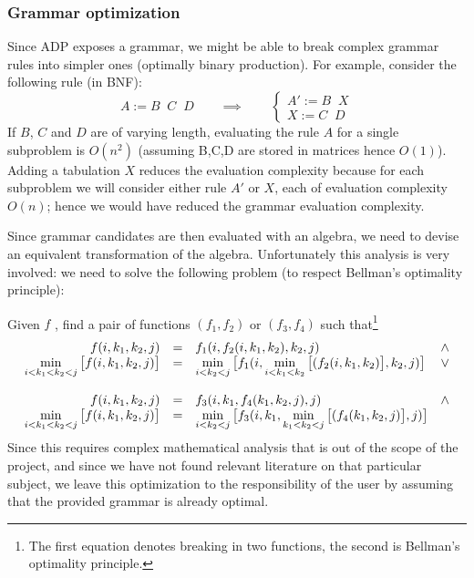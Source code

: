 \subsubsection{Grammar optimization} \label{grammar_opt}
Since ADP exposes a grammar, we might be able to break complex grammar rules into simpler ones (optimally binary production). For example, consider the following rule (in BNF):
\[A := B\;\;C\;\;D \qquad \implies \qquad \left\{\begin{array}{l} A' := B\;\;X \\ X := C\;\;D \end{array} \right. \]
If $B$, $C$ and $D$ are of varying length, evaluating the rule $A$ for a single subproblem is $O(n^2)$ (assuming B,C,D are stored in matrices hence $O(1)$). Adding a tabulation $X$ reduces the evaluation complexity because for each subproblem we will consider either rule $A'$ or $X$, each of evaluation complexity $O(n)$; hence we would have reduced the grammar evaluation complexity.

Since grammar candidates are then evaluated with an algebra, we need to devise an equivalent transformation of the algebra. Unfortunately this analysis is very involved: we need to solve the following problem (to respect Bellman's optimality principle\cite{bellman_principle}):

Given $f$ , find a pair of functions $(f_1,f_2)$ or $(f_3,f_4)$ such that\footnote{The first equation denotes breaking in two functions, the second is Bellman's optimality principle.}
\[\begin{array}{rcll}
f(i,k_1,k_2,j) &=& f_1(i,f_2(i,k_1,k_2),k_2,j) & \land \\
	\min\limits_{i<k_1<k_2<j}\big[ f(i,k_1,k_2,j) \big] &=& \min\limits_{i<k_2<j} \big[ f_1(i,\min\limits_{i<k_1<k_2} \big[ (f_2(i,k_1,k_2  ) \big],k_2,j) \big] & \lor \vspace{12pt} \\
f(i,k_1,k_2,j) &=& f_3(i,k_1,f_4(k_1,k_2,j),j) & \land \\
	\min\limits_{i<k_1<k_2<j}\big[ f(i,k_1,k_2,j) \big] &=& \min\limits_{i<k_2<j} \big[ f_3(i,k_1,\min\limits_{k_1<k_2<j} \big[ (f_4(k_1,k_2,j) \big],j) \big]
\end{array}\]
Since this requires complex mathematical analysis that is out of the scope of the project, and since we have not found relevant literature on that particular subject, we leave this optimization to the responsibility of the user by assuming that the provided grammar is already optimal.

